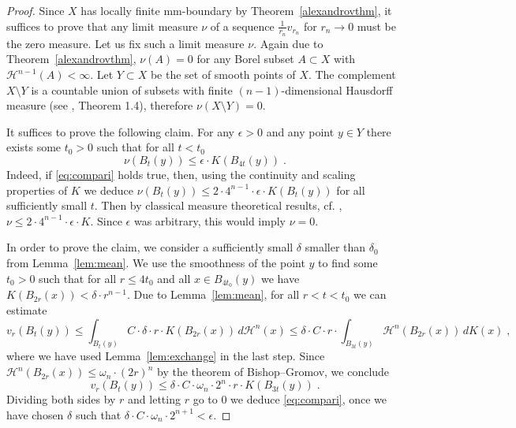 \documentclass[12pt,leqno,intlimits]{amsart}
\numberwithin{equation}{section}
\theoremstyle{definition}
\theoremstyle{remark}
\newcommand{\tref}[1]{Theorem~\ref{#1}}
\newcommand{\lref}[1]{Lemma~\ref{#1}}
\begin{document}
\begin{proof}
 Since $X$ has locally finite mm-boundary by
\tref{alexandrovthm}, it suffices to prove that  any limit measure $\nu$ of a sequence $\frac 1 {r_n} v_{r_n}$ for $r_n\to 0$ must be the zero measure.
Let us fix such a limit measure $\nu$.  Again due to \tref{alexandrovthm}, $\nu (A)=0$ for any Borel subset $A\subset X$ with $\mathcal H^{n-1} (A)<\infty$.
Let $Y\subset X$ be the set of smooth points of $X$.
The complement $X\setminus Y$ is a countable union of subsets with finite $(n-1)$-dimensional Hausdorff measure (see \cite{Schneider}, Theorem 1.4), therefore $\nu (X\setminus Y) =0$.


It suffices to prove the following claim. For any $\epsilon   >0$ and  any point $y\in Y$ there exists some $t_0>0$ such that
for all $t<t_0$
\begin{equation} \label{eq:compari}
 \nu (B_t (y)) \leq \epsilon \cdot K (B_{4t}(y)) \; .
\end{equation}
Indeed, if \eqref{eq:compari} holds true, then, using the continuity and scaling properties of $K$ we deduce
$\nu (B_t(y)) \leq 2\cdot 4^{n-1} \cdot \epsilon \cdot K (B_t (y))$ for all sufficiently small $t$. Then by classical measure theoretical results, cf. \cite{Federer}, $\nu \leq 2\cdot 4^{n-1} \cdot  \epsilon  \cdot K$. Since $\epsilon$ was arbitrary, this would imply $\nu  =0$.

In order to prove the claim, we consider a sufficiently small $\delta$ smaller than  $ \delta _0$ from \lref{lem:mean}. We use the smoothness of the point $y$
to find some $t_0>0$ such that  for all $r \leq 4t_0$ and all
 $x\in B_{4t_0} (y)$ we have
$K(B_{2r} (x)) < \delta \cdot r^{n-1}$.    Due to  \lref{lem:mean}, for all $r<t<t_0$ we can estimate
$$v_r (B_t (y)) \leq \int _{B_t(y)} C \cdot  \delta \cdot r\cdot  K(B_{2r} (x))\, d\mathcal H^n (x) \leq \delta \cdot C \cdot r\cdot \int _{B_{3t} (y)}
\mathcal  H^n (B_{2r} (x)) \, dK (x) \; ,$$
where we have used \lref{lem:exchange} in the last step.
Since $\mathcal  H^n (B_{2r} (x)) \leq \omega _n \cdot (2r)^n$ by the theorem of Bishop--Gromov, we conclude
$$ v_r (B_t (y)) \leq  \delta \cdot C \cdot \omega _n \cdot  2^n \cdot r \cdot K (B_{3t} (y)) \; .$$
Dividing both sides by $r$ and letting $r$ go to $0$ we deduce \eqref{eq:compari}, once we have chosen $\delta$ such that
$\delta \cdot C\cdot \omega_n \cdot 2^{n+1} < \epsilon $.
\end{proof}
\end{document}
